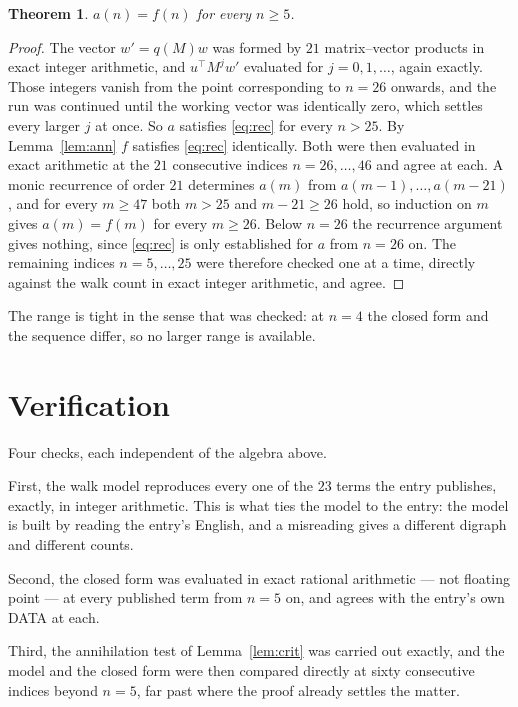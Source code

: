 \documentclass[11pt,a4paper]{article}
\theoremstyle{plain}
\newtheorem{theorem}{Theorem}
\theoremstyle{definition}
\begin{document}
\begin{theorem}
$a(n)=f(n)$ for every $n\ge5$.
\end{theorem}

\begin{proof}
The vector $w'=q(M)w$ was formed by $21$ matrix--vector products in exact integer
arithmetic, and $u^{\!\top}M^{j}w'$ evaluated for $j=0,1,\dots$, again exactly. Those integers
vanish from the point corresponding to $n=26$ onwards, and the run was continued until the
working vector was identically zero, which settles every larger $j$ at once. So $a$ satisfies
\eqref{eq:rec} for every $n>25$. By Lemma~\ref{lem:ann} $f$ satisfies \eqref{eq:rec}
identically. Both were then evaluated in exact arithmetic at the $21$ consecutive indices
$n=26,\dots,46$ and agree at each. A monic recurrence of order $21$
determines $a(m)$ from $a(m-1),\dots,a(m-21)$, and for every $m\ge47$ both
$m>25$ and $m-21\ge26$ hold, so induction on $m$ gives $a(m)=f(m)$ for every
$m\ge26$.
Below $n=26$ the recurrence argument gives nothing, since \eqref{eq:rec} is only
established for $a$ from $n=26$ on. The remaining indices $n=5,\dots,25$ were
therefore checked one at a time, directly against the walk count in exact integer arithmetic,
and agree.
\end{proof}

The range is tight in the sense that was checked: at $n=4$ the closed form and the sequence differ, so no larger range is available.

\section{Verification}

Four checks, each independent of the algebra above.

First, the walk model reproduces every one of the $23$ terms the entry publishes,
exactly, in integer arithmetic. This is what ties the model to the entry: the model is built
by reading the entry's English, and a misreading gives a different digraph and different
counts.

Second, the closed form was evaluated in exact rational arithmetic --- not floating point ---
at every published term from $n=5$ on, and agrees with the entry's own DATA at each.

Third, the annihilation test of Lemma~\ref{lem:crit} was carried out exactly, and the model
and the closed form were then compared directly at sixty consecutive indices beyond
$n=5$, far past where the proof already settles the matter.
\end{document}
